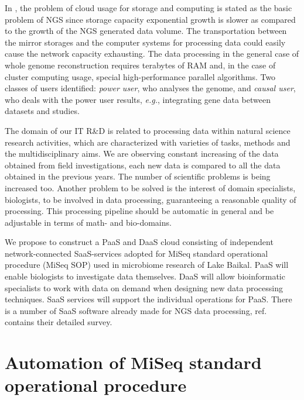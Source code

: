 \documentclass[a4paper]{jpconf}
\begin{document}
In \cite{guo16}, the problem of cloud usage for storage and computing is stated as the basic problem of NGS since storage capacity exponential growth is slower as compared to the growth of the NGS generated data volume. The transportation between the mirror storages and the computer systems for processing data could easily cause the network capacity exhausting. The data processing in the general case of whole genome reconstruction requires terabytes of RAM and, in the case of cluster computing usage, special high-performance parallel algorithms. Two classes of users identified: \emph{power user}, who analyses the genome, and \emph{causal user}, who deals with the power user results, \emph{e.g.}, integrating gene data between datasets and studies.



The domain of our IT R\&D is related to processing data within natural science research activities, which are characterized with varieties of tasks, methods and the multidisciplinary aims. %
We are observing constant increasing of the data obtained from field investigations, each new data is compared to all the data obtained in the previous years. The number of scientific problems is being increased too. Another problem to be solved is the interest of domain specialists, biologists, to be involved in data processing, guaranteeing a reasonable quality of processing.  This processing pipeline should be automatic in general and be adjustable in terms of math- and bio-domains.

We propose to construct a PaaS and DaaS cloud consisting of independent network-connected SaaS-services adopted for MiSeq standard operational procedure (MiSeq SOP) used in microbiome research of Lake Baikal. PaaS will enable biologists to investigate data themselves. DaaS will allow bioinformatic specialists to work with data on demand when designing new data processing techniques. SaaS services will support the individual operations for PaaS. There is a number of SaaS software already made for NGS data processing, ref.~\cite{guo16} contains their detailed survey. %


\section{Automation of MiSeq standard operational procedure}
\label{sec:sop}
\end{document}
